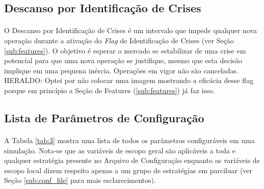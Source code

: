 \subsection{Descanso por Identificação de Crises}
\label{sub:crisis_halt}

\paragraph{} O Descanso por Identificação de Crises é um intervalo que impede qualquer nova operação durante a ativação do \textit{Flag} de Identificação de Crises (ver Seção \ref{sub:features}). O objetivo é esperar o mercado se estabilizar de uma crise em potencial para que uma nova operação se justifique, mesmo que esta decisão implique em uma pequena inércia. Operações em vigor não são canceladas. \color{red} HERALDO: Optei por não colocar uma imagem mostrando a eficácia desse flag porque em princípio a Seção de Features (\ref{sub:features}) já faz isso. 



\subsection{Lista de Parâmetros de Configuração}
\label{sub:params_list}

\paragraph{} A Tabela \ref{tab:3} mostra uma lista de todos os parâmetros configuráveis em uma simulação. Nota-se que as variáveis de escopo geral são aplicáveis a toda e qualquer estratégia presente no Arquivo de Configuração enquanto as variáveis de escopo local dizem respeito apenas a um grupo de estratégias em parciluar (ver Seção \ref{sub:conf_file} para mais esclarecimentos).

